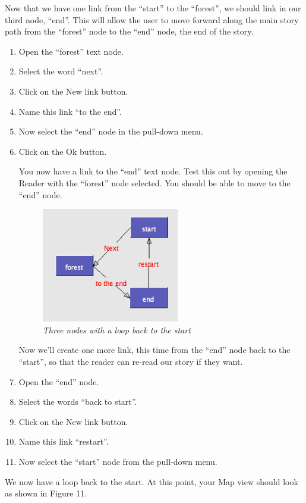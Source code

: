 \documentclass{article}
\begin{document}
Now that we have one link from the ``start'' to the ``forest'', we should link
in our third node, ``end''. This will allow the user to move forward along the
main story path from the ``forest'' node to the ``end'' node, the end of the story.

\begin{enumerate}
\item Open the ``forest'' text node.
\item Select the word ``next''.
\item Click on the New link button.
\item Name this link ``to the end''.
\item Now select the ``end'' node in the pull-down menu.
\item Click on the Ok button.

You now have a link to the ``end'' text node. Test this out by opening the
Reader with the ``forest'' node selected. You should be able to move to the
``end'' node. 

 
\begin{figure}[ht]
  \centering
  \includegraphics[width=6cm]{images/hypedyn-tutorial-1-figure-11}
  \caption{\textit{Three nodes with a loop back to the start}}
\end{figure} 

Now we'll create one more link, this time from the ``end'' node back to the
``start'', so that the reader can re-read our story if they want.

\item Open the ``end'' node.
\item Select the words ``back to start''.
\item Click on the New link button.
\item Name this link ``restart''.
\item Now select the ``start'' node from the pull-down menu.
\end{enumerate}

We now have a loop back to the start. At this point, your Map view should look
as shown in Figure 11.
\end{document}
